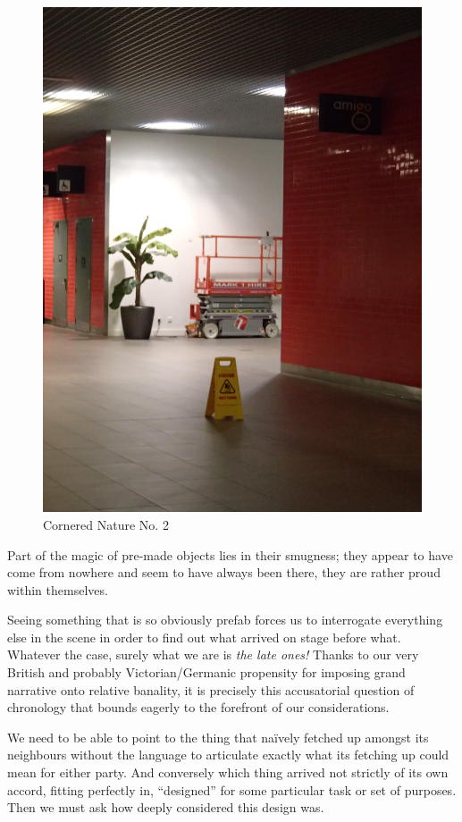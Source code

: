 \documentclass{book}
\begin{document}
\begin{figure}
\centering
\includegraphics[width=\textwidth,angle=-90]{figures/P1050158.JPG}
\caption{Cornered Nature No. 2}
\end{figure}

Part of the magic of pre-made objects lies in their smugness; they appear to
have come from nowhere and seem to have always been there, they are rather
proud within themselves.

Seeing something that is so obviously prefab forces us to interrogate
everything else in the scene in order to find out what arrived on stage before
what.  Whatever the case, surely what we are is \emph{the late ones!} Thanks to
our very British and probably Victorian/Germanic propensity for imposing
grand narrative onto relative banality, it is precisely this accusatorial
question of chronology that bounds eagerly to the forefront of our
considerations.

We need to be able to point to the thing that naïvely fetched up amongst its
neighbours without the language to articulate exactly what its fetching up
could mean for either party. And conversely which thing arrived not strictly of
its own accord, fitting perfectly in, ``designed'' for some particular task or
set of purposes. Then we must ask how deeply considered this design was.
\end{document}
